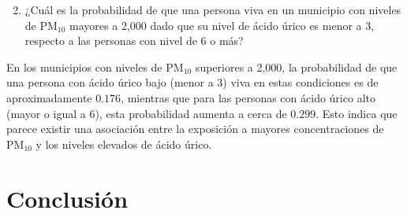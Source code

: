 \documentclass[12pt, letterpaper]{report}
\begin{document}
\begin{enumerate}
    \setcounter{enumi}{1}
    \item ¿Cuál es la probabilidad de que una persona viva en un municipio con niveles de \( \text{PM}_{10} \) mayores a 2,000 dado que su nivel de ácido úrico es menor a 3, respecto a las personas con nivel de 6 o más?
\end{enumerate}

En los municipios con niveles de \( \text{PM}_{10} \) superiores a 2,000, la probabilidad de que una persona con ácido úrico bajo (menor a 3) viva en estas condiciones es de aproximadamente \(0.176\), mientras que para las personas con ácido úrico alto (mayor o igual a 6), esta probabilidad aumenta a cerca de \(0.299\). Esto indica que parece existir una asociación entre la exposición a mayores concentraciones de \( \text{PM}_{10} \) y los niveles elevados de ácido úrico.






\section*{Conclusión}


\printbibliography[title={Referencias}]
\end{document}
